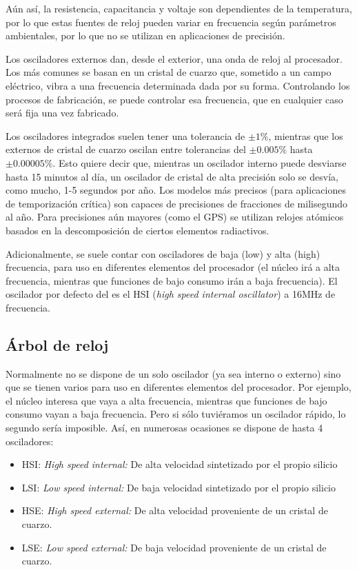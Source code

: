 \documentclass[../main.tex]{subfiles}
\begin{document}
        Aún así, la resistencia, capacitancia y voltaje son dependientes de la temperatura, por lo que estas fuentes de reloj pueden variar en frecuencia según parámetros ambientales, por lo que no se utilizan en aplicaciones de precisión.

        Los osciladores externos dan, desde el exterior, una onda de reloj al procesador. Los más comunes se basan en un cristal de cuarzo que, sometido a un campo eléctrico, vibra a una frecuencia determinada dada por su forma. Controlando los procesos de fabricación, se puede controlar esa frecuencia, que en cualquier caso será fija una vez fabricado.

        Los osciladores integrados suelen tener una tolerancia de $\pm 1\%$, mientras que los externos de cristal de cuarzo oscilan entre tolerancias del $\pm 0.005\%$ hasta $\pm 0.00005\%$. Esto quiere decir que, mientras un oscilador interno puede desviarse hasta 15 minutos al día, un oscilador de cristal de alta precisión solo se desvía, como mucho, 1-5 segundos por año. Los modelos más precisos (para aplicaciones de temporización crítica) son capaces de precisiones de fracciones de milisegundo al año. Para precisiones aún mayores (como el GPS) se utilizan relojes atómicos basados en la descomposición de ciertos elementos radiactivos.

        Adicionalmente, se suele contar con osciladores de baja (low) y alta (high) frecuencia, para uso en diferentes elementos del procesador (el núcleo irá a alta frecuencia, mientras que funciones de bajo consumo irán a baja frecuencia). El oscilador por defecto del \MCU es el HSI (\emph{high speed internal oscillator}) a 16MHz de frecuencia.

    \subsection{Árbol de reloj}
    
        Normalmente no se dispone de un solo oscilador (ya sea interno o externo) sino que se tienen varios para uso en diferentes elementos del procesador. Por ejemplo, el núcleo interesa que vaya a alta frecuencia, mientras que funciones de bajo consumo vayan a baja frecuencia. Pero si sólo tuviéramos un oscilador rápido, lo segundo sería imposible. Así, en numerosas ocasiones se dispone de hasta 4 osciladores:

        \begin{itemize}
            \item HSI: \emph{High speed internal:} De alta velocidad sintetizado por el propio silicio
            \item LSI: \emph{Low speed internal:} De baja velocidad sintetizado por el propio silicio
            \item HSE: \emph{High speed external:} De alta velocidad proveniente de un cristal de cuarzo.
            \item LSE: \emph{Low speed external:} De baja velocidad proveniente de un cristal de cuarzo.
        \end{itemize}
\end{document}
